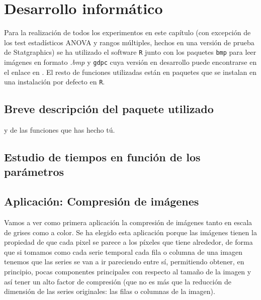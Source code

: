 %
%

\chapter{Desarrollo informático}
\label{ch:informatica}

Para la realización de todos los experimentos en este capítulo (con excepción de los test estadísticos ANOVA y rangos múltiples, hechos en una versión de prueba de Statgraphics) se ha utilizado el software \texttt{R} junto con los paquetes \texttt{bmp} para leer imágenes en formato \textit{.bmp} y \texttt{gdpc} cuya versión en desarrollo puede encontrarse en el enlace en \cite{ezeq}. El resto de funciones utilizadas están en paquetes que se instalan en una instalación por defecto en \texttt{R}.

\section{Breve descripción del paquete utilizado}
y de las funciones que has hecho tú.

\section{Estudio de tiempos en función de los parámetros}


\section{Aplicación: Compresión de imágenes}

Vamos a ver como primera aplicación la compresión de imágenes tanto en escala de grises como a color. Se ha elegido esta aplicación porque las imágenes tienen la propiedad de que cada pixel se parece a los píxeles que tiene alrededor, de forma que si tomamos como cada serie temporal cada fila o columna de una imagen tenemos que las series se van a ir pareciendo entre sí, permitiendo obtener, en principio, pocas componentes principales con respecto al tamaño de la imagen y así tener un alto factor de compresión (que no es más que la reducción de dimensión de las series originales: las filas o columnas de la imagen).\\

